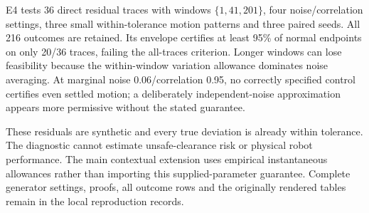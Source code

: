 E4 tests 36 direct residual traces with windows $\{1,41,201\}$, four noise/correlation settings, three small within-tolerance motion patterns and three paired seeds. All 216 outcomes are retained. Its envelope certifies at least 95\% of normal endpoints on only 20/36 traces, failing the all-traces criterion. Longer windows can lose feasibility because the within-window variation allowance dominates noise averaging. At marginal noise 0.06/correlation 0.95, no correctly specified control certifies even settled motion; a deliberately independent-noise approximation appears more permissive without the stated guarantee.

These residuals are synthetic and every true deviation is already within tolerance. The diagnostic cannot estimate unsafe-clearance risk or physical robot performance. The main contextual extension uses empirical instantaneous allowances rather than importing this supplied-parameter guarantee. Complete generator settings, proofs, all outcome rows and the originally rendered tables remain in the local reproduction records.

